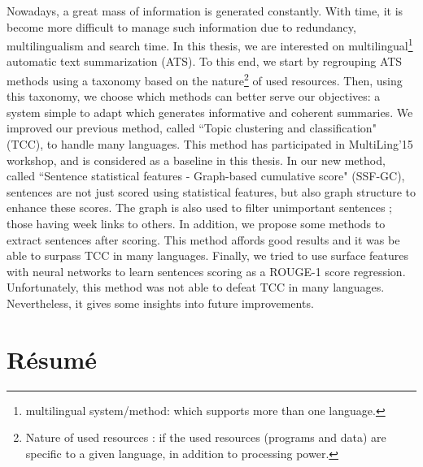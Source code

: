 Nowadays, a great mass of information is generated constantly.
With time, it is become more difficult to manage such information due to redundancy, multilingualism and search time.
In this thesis, we are interested on multilingual\footnote{multilingual system/method: which supports more than one language.} automatic text summarization (ATS). 
To this end, we start by regrouping ATS methods using a taxonomy based on the nature\footnote{Nature of used resources : if the used resources (programs and data) are specific to a given language, in addition to processing power.} of used resources.
Then, using this taxonomy, we choose which methods can better serve our objectives: a system simple to adapt which generates informative and coherent summaries.
We improved our previous method, called ``Topic clustering and classification" (TCC), to handle many languages.
This method has participated in MultiLing'15 workshop, and is considered as a baseline in this thesis. 
In our new method, called ``Sentence statistical features - Graph-based cumulative score" (SSF-GC), sentences are not just scored using statistical features, but also graph structure to enhance these scores. 
The graph is also used to filter unimportant sentences ; those having week links to others.
In addition, we propose some methods to extract sentences after scoring. 
This method affords good results and it was be able to surpass TCC in many languages. 
Finally, we tried to use surface features with neural networks to learn sentences scoring as a ROUGE-1 score regression. 
Unfortunately, this method was not able to defeat TCC in many languages. 
Nevertheless, it gives some insights into future improvements.

\chapter*{Résumé}

